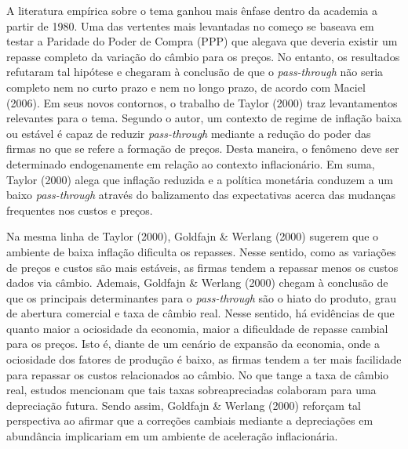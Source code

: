 \documentclass[12pt]{article}
\begin{document}
A literatura empírica sobre o tema ganhou mais ênfase dentro da academia
a partir de 1980. Uma das vertentes mais levantadas no começo se baseava
em testar a Paridade do Poder de Compra (PPP) que alegava que deveria
existir um repasse completo da variação do câmbio para os preços. No
entanto, os resultados refutaram tal hipótese e chegaram à conclusão de
que o \emph{pass-through} não seria completo nem no curto prazo e nem no
longo prazo, de acordo com Maciel (2006). Em seus novos contornos, o
trabalho de Taylor (2000) traz levantamentos relevantes para o tema.
Segundo o autor, um contexto de regime de inflação baixa ou estável é
capaz de reduzir \emph{pass-through} mediante a redução do poder das
firmas no que se refere a formação de preços. Desta maneira, o fenômeno
deve ser determinado endogenamente em relação ao contexto inflacionário.
Em suma, Taylor (2000) alega que inflação reduzida e a política
monetária conduzem a um baixo \emph{pass-through} através do balizamento
das expectativas acerca das mudanças frequentes nos custos e preços.

Na mesma linha de Taylor (2000), Goldfajn \& Werlang (2000) sugerem que
o ambiente de baixa inflação dificulta os repasses. Nesse sentido, como
as variações de preços e custos são mais estáveis, as firmas tendem a
repassar menos os custos dados via câmbio. Ademais, Goldfajn \& Werlang
(2000) chegam à conclusão de que os principais determinantes para o
\emph{pass-through} são o hiato do produto, grau de abertura comercial e
taxa de câmbio real. Nesse sentido, há evidências de que quanto maior a
ociosidade da economia, maior a dificuldade de repasse cambial para os
preços. Isto é, diante de um cenário de expansão da economia, onde a
ociosidade dos fatores de produção é baixo, as firmas tendem a ter mais
facilidade para repassar os custos relacionados ao câmbio. No que tange
a taxa de câmbio real, estudos mencionam que tais taxas sobreapreciadas
colaboram para uma depreciação futura. Sendo assim, Goldfajn \& Werlang
(2000) reforçam tal perspectiva ao afirmar que a correções cambiais
mediante a depreciações em abundância implicariam em um ambiente de
aceleração inflacionária.
\end{document}
